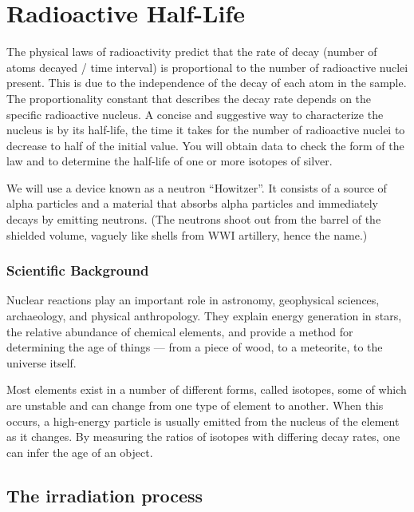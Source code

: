 \chapter{Radioactive Half-Life}


The physical laws of radioactivity predict that the rate of decay (number of atoms
decayed / time interval) is proportional to the number of radioactive nuclei present. This
is due to the independence of the decay of
each atom in the sample. The proportionality constant that describes the decay rate
depends on the specific radioactive nucleus. A concise and suggestive way to
characterize the nucleus is by its half-life, the time it takes for the number of radioactive
nuclei to decrease to half of the initial value. You will obtain data to check the form of
the law and to determine the half-life of one or more isotopes of silver.

We will use a device known as a neutron ``Howitzer''. It consists of a source of alpha
particles and a material that absorbs alpha particles and immediately decays by emitting
neutrons. (The neutrons shoot out from the barrel of the shielded volume, vaguely like
shells from WWI artillery, hence the name.)

\subsection{Scientific Background}

Nuclear reactions play an important role in astronomy, geophysical sciences, archaeology, and physical anthropology. They explain energy generation in stars, the relative abundance of chemical elements, and provide a method for determining the age of things --- from a piece of wood, to a meteorite, to the universe itself.

Most elements exist in a number of different forms, called isotopes, some of which are unstable and can change from one type of element to another. When this occurs, a high-energy particle is usually emitted from the nucleus of the element as it changes. By measuring the ratios of isotopes with differing decay rates, one can infer the age of an object.

\section{The irradiation process}


